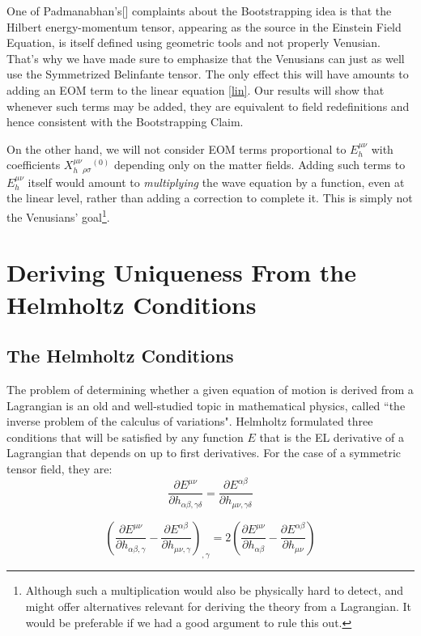 \documentclass[aps,physrev,preprint,groupedaddress]{revtex4-2}
\begin{document}
One of Padmanabhan's[] complaints about the Bootstrapping idea is that the Hilbert energy-momentum tensor, appearing as the source in the Einstein Field Equation, is itself defined using geometric tools and not properly Venusian. That's why we have made sure to emphasize that the Venusians can just as well use the Symmetrized Belinfante tensor. The only effect this will have amounts to adding an EOM term to the linear equation \eqref{lin}. Our results will show that whenever such terms may be added, they are equivalent to field redefinitions and hence consistent with the Bootstrapping Claim. 

On the other hand, we will not consider EOM terms proportional to \(E_h^{\mu\nu}\) with coefficients \(X_h^{\mu\nu}{}_{\rho\sigma}{}^{(0)}\) depending only on the matter fields. Adding such terms to \(E_h^{\mu\nu}\) itself would amount to \textit{multiplying} the wave equation by a function, even at the linear level, rather than adding a correction to complete it. This is simply not the Venusians' goal\footnote{Although such a multiplication would also be physically hard to detect, and might offer alternatives relevant for deriving the theory from a Lagrangian. It would be preferable if we had a good argument to rule this out.}.  

\section{Deriving Uniqueness From the Helmholtz Conditions}

\subsection{The Helmholtz Conditions}
The problem of determining whether a given equation of motion is derived from a Lagrangian is an old and well-studied topic in mathematical physics, called ``the inverse problem of the calculus of variations". Helmholtz \cite{Helmholtz} formulated three conditions that will be satisfied by any function \(E\)
that is the EL derivative of a Lagrangian that depends on up to first derivatives. For the case of a symmetric tensor field, they are:
 \begin{equation}\label{H1}\frac{\partial E^{\mu\nu}}{\partial h_{\alpha\beta,\gamma\delta}}=\frac{\partial E^{\alpha\beta}}{\partial h_{\mu\nu,\gamma\delta}}\end{equation}
 
\begin{equation}\label{H2}{\left(\frac{\partial E^{\mu\nu}}{\partial h_{\alpha\beta,\gamma}}-\frac{\partial E^{\alpha\beta}}{\partial h_{\mu\nu,\gamma}}\right)}_{,\gamma}=2\left(\frac{\partial E^{\mu\nu}}{\partial h_{\alpha\beta}}-\frac{\partial E^{\alpha\beta}}{\partial h_{\mu\nu}}\right)\end{equation}
\end{document}
